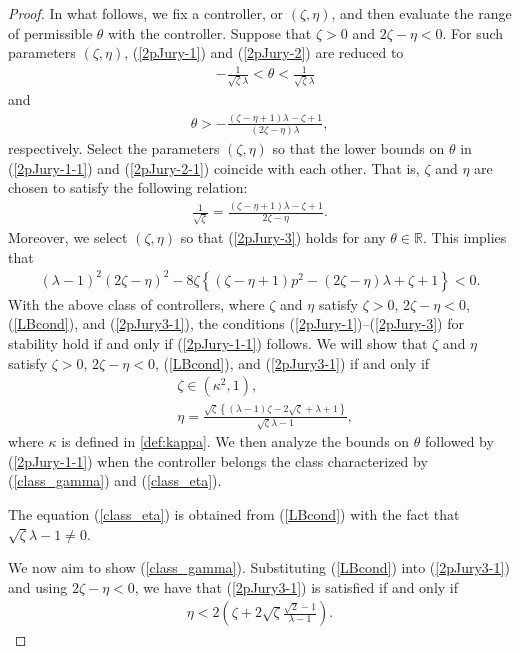 \documentclass[letterpaper, 12pt, draftcls, onecolumn]{ieeeconf}
\begin{document}
\begin{proof}
In what follows, we fix a controller, or $(\zeta,\eta)$, and then evaluate the
range of permissible $\theta$ with the controller.
Suppose that $\zeta>0$ and $2\zeta-\eta<0$.
For such parameters $(\zeta,\eta)$, (\ref{2pJury-1}) and (\ref{2pJury-2}) are
reduced to
\begin{align}
&-\frac{1}{\sqrt{\zeta}\lambda} <\theta< \frac{1}{\sqrt{\zeta}\lambda}
\label{2pJury-1-1}
\end{align}
and
\begin{align} 
\theta > -\frac{ (\zeta-\eta+1)\lambda-\zeta+1 }
{ (2\zeta-\eta)\lambda },
\label{2pJury-2-1}
\end{align}
respectively.
Select the parameters $(\zeta,\eta)$ so that the lower bounds on $\theta$ in
(\ref{2pJury-1-1}) and (\ref{2pJury-2-1}) coincide with each other.
That is, $\zeta$ and $\eta$ are chosen to satisfy the following relation:
\begin{align}
\frac{1}{\sqrt{\zeta}}=\frac{ (\zeta-\eta+1)\lambda-\zeta+1 }{2\zeta-\eta}.
\label{LBcond}
\end{align}
Moreover, we select $(\zeta,\eta)$ so that (\ref{2pJury-3}) holds for any
$\theta \in \mathbb{R}$.
This implies that
\begin{align}
(\lambda-1)^2(2\zeta-\eta)^2
-8\zeta \left\{(\zeta-\eta+1)p^2-(2\zeta-\eta)\lambda+\zeta+1\right\}<0.
\label{2pJury3-1}
\end{align}
With the above class of controllers,
where $\zeta$ and $\eta$ satisfy $\zeta>0$, $2\zeta-\eta<0$, (\ref{LBcond}),
and (\ref{2pJury3-1}), the conditions (\ref{2pJury-1})--(\ref{2pJury-3}) for
stability hold if and only if
(\ref{2pJury-1-1}) follows.
We will show that $\zeta$ and $\eta$ satisfy $\zeta>0$, $2\zeta-\eta<0$, (\ref{LBcond}),
and (\ref{2pJury3-1}) if and only if
\begin{align}
&\zeta\in(\kappa^2,1),\label{class_gamma}\\
&\eta=
\frac{\sqrt{\zeta}\left\{(\lambda-1)\zeta-2\sqrt{\zeta}+\lambda+1\right\}}
{\sqrt{\zeta}\lambda-1},\label{class_eta}
\end{align}
where $\kappa$ is defined in \eqref{def:kappa}.
We then analyze the bounds on $\theta$ followed by (\ref{2pJury-1-1}) when the
controller belongs the class characterized by (\ref{class_gamma}) and
(\ref{class_eta}).

The equation (\ref{class_eta}) is obtained from (\ref{LBcond}) with
the fact that $\sqrt{\zeta}\lambda-1\neq0$.

We now aim to show (\ref{class_gamma}).
Substituting (\ref{LBcond}) into (\ref{2pJury3-1}) and using $2\zeta-\eta<0$,
we have that (\ref{2pJury3-1}) is satisfied if and only if
\begin{align}
\eta<2\left(\zeta+2\sqrt{\zeta}\frac{\sqrt{2}-1}{\lambda-1}\right).
\label{2pJury3-2}
\end{align}


\end{proof}
\end{document}
